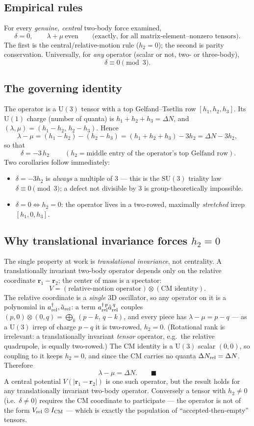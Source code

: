 \documentclass[11pt]{article}
\newcommand{\shift}{\ensuremath{\Delta N}}
\newcommand{\diff}{\ensuremath{\delta}}
\newcommand{\lm}{\ensuremath{\lambda}}
\newcommand{\mumu}{\ensuremath{\mu}}
\begin{document}
\subsection{Empirical rules}
For every \emph{genuine, central} two-body force examined,
\[
\diff = 0, \qquad \lm+\mumu \ \text{even}
\qquad\text{(exactly, for all matrix-element--nonzero tensors).}
\]
The first is the central/relative-motion rule ($h_2=0$); the second is parity
conservation. Universally, for \emph{any} operator (scalar or not, two- or
three-body),
\[
\diff \equiv 0 \pmod 3 .
\]

\subsection{The governing identity}
The operator is a $\mathrm{U}(3)$ tensor with a top Gelfand--Tsetlin row
$[h_1,h_2,h_3]$. Its $\mathrm{U}(1)$ charge (number of quanta) is
$h_1+h_2+h_3=\shift$, and $(\lm,\mumu)=(h_1-h_2,\,h_2-h_3)$. Hence
\[
\lm-\mumu=(h_1-h_2)-(h_2-h_3)=(h_1+h_2+h_3)-3h_2=\shift-3h_2,
\]
so that
\[
\boxed{\ \diff = -3\,h_2\ }
\qquad (h_2 = \text{middle entry of the operator's top Gelfand row}).
\]
Two corollaries follow immediately:
\begin{itemize}
\item $\diff=-3h_2$ is \emph{always} a multiple of $3$ --- this is the
$\mathrm{SU}(3)$ triality law $\diff\equiv0\pmod3$; a defect not divisible by
$3$ is group-theoretically impossible.
\item $\diff=0 \iff h_2=0$: the operator lives in a two-rowed, maximally
\emph{stretched} irrep $[h_1,0,h_3]$.
\end{itemize}

\subsection{Why translational invariance forces $h_2=0$}
The single property at work is \emph{translational invariance}, not centrality.
A translationally invariant two-body operator depends only on the relative
coordinate $\mathbf r_1-\mathbf r_2$; the center of mass is a spectator:
\[
V=(\text{relative-motion operator})\otimes(\text{CM identity}).
\]
The relative coordinate is a \emph{single} 3D oscillator, so any operator on it
is a polynomial in $a^\dagger_{\rm rel},\tilde a_{\rm rel}$: a term
$a^{\dagger\,p}_{\rm rel}\tilde a^{\,q}_{\rm rel}$ couples
$(p,0)\otimes(0,q)=\bigoplus_k (p-k,\,q-k)$, and every piece has
$\lm-\mumu=p-q$ --- as a $\mathrm{U}(3)$ irrep of charge $p-q$ it is two-rowed,
$h_2=0$. (Rotational rank is irrelevant: a translationally invariant
\emph{tensor} operator, e.g.\ the relative quadrupole, is equally two-rowed.)
The CM identity is a $\mathrm{U}(3)$ scalar $(0,0)$, so coupling to it keeps
$h_2=0$, and since the CM carries no quanta $\shift_{\rm rel}=\shift$. Therefore
\[
\lm-\mumu=\shift .\qquad\blacksquare
\]
A central potential $V(|\mathbf r_1-\mathbf r_2|)$ is one such operator, but the
result holds for any translationally invariant two-body operator. Conversely a
tensor with $h_2\neq0$ (i.e.\ $\diff\neq0$) requires the CM coordinate to
participate --- the operator is not of the form $V_{\rm rel}\otimes I_{\rm CM}$
--- which is exactly the population of ``accepted-then-empty'' tensors.
\end{document}
